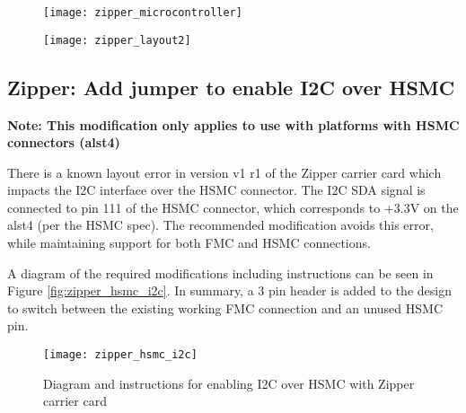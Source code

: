   	\begin{figure}[h]
  		\begin{center}
		\texttt{[image: zipper\_microcontroller]}
		\end{center}
	\end{figure}
	\label{fig:zipper_microcontroller}
	\pagebreak
	\begin{figure}[ht]
		\begin{center}
		\texttt{[image: zipper\_layout2]}
		\end{center}
	\end{figure}
	\label{fig:zipper_layout2}
	\pagebreak
\subsection*{Zipper: Add jumper to enable I2C over HSMC}
\normalsize
\textbf{Note: This modification only applies to use with platforms with HSMC connectors (alst4)}\par\medskip
\noindent There is a known layout error in version v1 r1 of the Zipper carrier card which impacts the I2C interface over the HSMC connector. The I2C SDA signal is connected to pin 111 of the HSMC connector, which corresponds to +3.3V on the alst4 (per the HSMC spec). The recommended modification avoids this error, while maintaining support for both FMC and HSMC connections.\par\medskip
\noindent A diagram of the required modifications including instructions can be seen in Figure \ref{fig:zipper_hsmc_i2c}. In summary, a 3 pin header is added to the design to switch between the existing working FMC connection and an unused HSMC pin.
  	\begin{figure}[ht]
	\centering
		\texttt{[image: zipper\_hsmc\_i2c]}
		\caption{Diagram and instructions for enabling I2C over HSMC with Zipper carrier card}
	\end{figure}
		\label{fig:zipper_hsmc_i2c}
